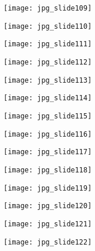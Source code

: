 \documentclass[main.tex]{subfiles}
\begin{document}
\begin{center}
\texttt{[image: jpg\_slide109]}
\end{center}

\begin{center}
\texttt{[image: jpg\_slide110]}
\end{center}

\begin{center}
\texttt{[image: jpg\_slide111]}
\end{center}

\begin{center}
\texttt{[image: jpg\_slide112]}
\end{center}

\begin{center}
\texttt{[image: jpg\_slide113]}
\end{center}

\begin{center}
\texttt{[image: jpg\_slide114]}
\end{center}

\begin{center}
\texttt{[image: jpg\_slide115]}
\end{center}

\begin{center}
\texttt{[image: jpg\_slide116]}
\end{center}

\begin{center}
\texttt{[image: jpg\_slide117]}
\end{center}

\begin{center}
\texttt{[image: jpg\_slide118]}
\end{center}

\begin{center}
\texttt{[image: jpg\_slide119]}
\end{center}

\begin{center}
\texttt{[image: jpg\_slide120]}
\end{center}

\begin{center}
\texttt{[image: jpg\_slide121]}
\end{center}

\begin{center}
\texttt{[image: jpg\_slide122]}
\end{center}
\end{document}
